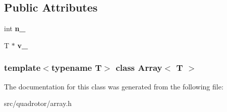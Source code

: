 \subsection*{\-Public \-Attributes}
\begin{DoxyCompactItemize}
\item 
\hypertarget{classArray_ac6494b108f60fb2d80ab65d7bb75390a}{int {\bfseries n\-\_\-}}\label{classArray_ac6494b108f60fb2d80ab65d7bb75390a}

\item 
\hypertarget{classArray_af7695e08563d3f4454f1213ca0d7b88a}{\-T $\ast$ {\bfseries v\-\_\-}}\label{classArray_af7695e08563d3f4454f1213ca0d7b88a}

\end{DoxyCompactItemize}
\subsubsection*{template$<$typename \-T$>$ class Array$<$ T $>$}



\-The documentation for this class was generated from the following file\-:\begin{DoxyCompactItemize}
\item 
src/quadrotor/array.\-h\end{DoxyCompactItemize}
